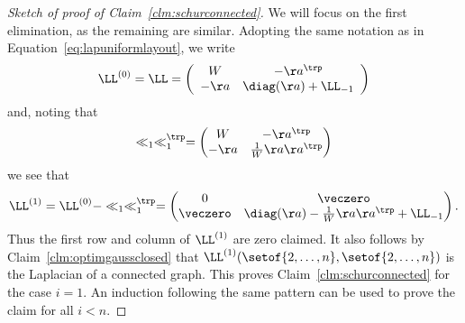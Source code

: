 \begin{proof}[Sketch of proof of Claim~\ref{clm:schurconnected}]
We will focus on the first elimination, as the remaining are similar.
Adopting the same notation as in Equation~\eqref{eq:lapuniformlayout},
we write
 \[
\LL^{(0)} = \LL  =
\left(
\begin{array}{ccc}
W & -\aa^\trp \\
-\aa& \diag(\aa) + \LL_{-1}
\end{array} \right)
\]
and, noting that
\[
  \ll_1 \ll_1^{\trp} =
  \begin{pmatrix}
   W & -\aa^\trp \\
-\aa & \frac{1}{W} \aa \aa^{\trp}
\end{pmatrix}
\]
we see that
\[
  \LL^{(1)}  = \LL^{(0)} - \ll_1 \ll_1^{\trp} =
  \begin{pmatrix}
   0 & \veczero \\
\veczero & \diag(\aa) - \frac{1}{W} \aa \aa^{\trp}  + \LL_{-1}
\end{pmatrix}
.
\]
Thus the first row and column of $\LL^{(1)}$ are zero claimed.
It also follows by Claim~\ref{clm:optimgaussclosed} that
$\LL^{(1)}(\setof{2,\ldots,n}, \setof{2,\ldots,n})$ is the
Laplacian of a connected graph.
This proves Claim~\ref{clm:schurconnected} for the case $i = 1$.
An induction following the same pattern can be used to prove the claim
for all $i < n$.
\end{proof}













